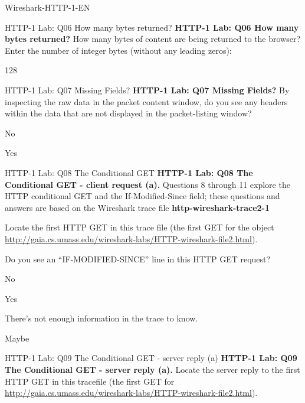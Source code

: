 \documentclass[a4paper]{article}
\begin{document}
\begin{quiz}{Wireshark-HTTP-1-EN}
\begin{shortanswer}[points=1]{HTTP-1 Lab: Q06 How many bytes returned?}
\textbf{HTTP-1 Lab: Q06 How many bytes returned?} How many bytes of content are being returned to the browser? Enter the number of integer bytes (without any leading zeros): 
\item 128
\end{shortanswer}

\begin{multi}[points=1,shuffle]{HTTP-1 Lab: Q07 Missing Fields?}
\textbf{HTTP-1 Lab: Q07 Missing Fields?} By inspecting the raw data in the packet content window, do you see any headers within the data that are not displayed in the packet-listing window?
\item* No
\item Yes
\end{multi}

\begin{multi}[points=1,shuffle]{HTTP-1 Lab: Q08 The Conditional GET}
\textbf{HTTP-1 Lab: Q08 The Conditional GET - client request (a).} 
Questions 8 through 11 explore the HTTP conditional GET and the If-Modified-Since field; these questions and answers are based on the Wireshark trace file \textbf{http-wireshark-trace2-1}

Locate the first HTTP GET in this trace file (the first GET for the object \href{http://gaia.cs.umass.edu/wireshark-labs/HTTP-wireshark-file2.html}{http://gaia.cs.umass.edu/wireshark-labs/HTTP-wireshark-file2.html}).

Do you see an ``IF-MODIFIED-SINCE'' line in this HTTP GET request? 
\item* No
\item Yes
\item There's not enough information in the trace to know.
\item Maybe
\end{multi}

\begin{multi}[points=1,shuffle]{HTTP-1 Lab: Q09 The Conditional GET - server reply (a)}
\textbf{HTTP-1 Lab: Q09 The Conditional GET - server reply (a).} Locate the server reply to the first HTTP GET in this tracefile (the first GET for \href{http://gaia.cs.umass.edu/wireshark-labs/HTTP-wireshark-file2.html}{http://gaia.cs.umass.edu/wireshark-labs/HTTP-wireshark-file2.html}).


\end{multi}
\end{quiz}
\end{document}
